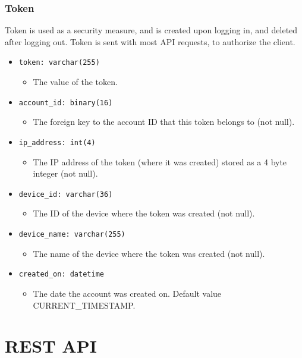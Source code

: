 \documentclass[12pt,openany,a4paper]{book}
\begin{document}
\subsubsection{Token}

Token is used as a security measure, and is created upon logging in, and deleted
after logging out. Token is sent with most API requests, to authorize the client.

\begin{itemize}
	\item \verb|token: varchar(255)|
	\begin{itemize}
		\item The value of the token.
	\end{itemize}
	\item \verb|account_id: binary(16)|
	\begin{itemize}
		\item The foreign key to the account ID that this token belongs to (not null).
	\end{itemize}
	\item \verb|ip_address: int(4)|
	\begin{itemize}
		\item The IP address of the token (where it was created) stored as a
		4 byte integer (not null).
	\end{itemize}
	\item \verb|device_id: varchar(36)|
	\begin{itemize}
		\item The ID of the device where the token was created (not null).
	\end{itemize}
	\item \verb|device_name: varchar(255)|
	\begin{itemize}
		\item The name of the device where the token was created (not null).
	\end{itemize}
	\item \verb|created_on: datetime|
	\begin{itemize}
		\item The date the account was created on. Default value
		CURRENT\_TIMESTAMP.
	\end{itemize}
\end{itemize}

\section{REST API}
\label{secn:rest_api}
\end{document}
